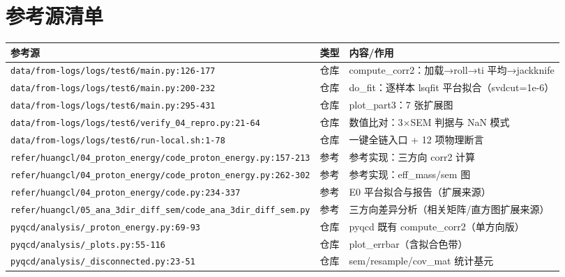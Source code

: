 \documentclass[UTF8]{ctexart}
\begin{document}
\section{参考源清单}
\begin{xltabular}{\textwidth}{llX}
\toprule
\textcolor{evidence}{参考源} & 类型 & 内容/作用 \\
\midrule
\endhead
\texttt{\nolinkurl{data/from-logs/logs/test6/main.py:126-177}} & 仓库 & compute\_corr2：加载→roll→ti 平均→jackknife \\
\texttt{\nolinkurl{data/from-logs/logs/test6/main.py:200-232}} & 仓库 & do\_fit：逐样本 lsqfit 平台拟合（svdcut=1e-6） \\
\texttt{\nolinkurl{data/from-logs/logs/test6/main.py:295-431}} & 仓库 & plot\_part3：7 张扩展图 \\
\texttt{\nolinkurl{data/from-logs/logs/test6/verify_04_repro.py:21-64}} & 仓库 & 数值比对：3$\times$SEM 判据与 NaN 模式 \\
\texttt{\nolinkurl{data/from-logs/logs/test6/run-local.sh:1-78}} & 仓库 & 一键全链入口 + 12 项物理断言 \\
\texttt{\nolinkurl{refer/huangcl/04_proton_energy/code_proton_energy.py:157-213}} & 参考 & 参考实现：三方向 corr2 计算 \\
\texttt{\nolinkurl{refer/huangcl/04_proton_energy/code_proton_energy.py:262-302}} & 参考 & 参考实现：eff\_mass/sem 图 \\
\texttt{\nolinkurl{refer/huangcl/04_proton_energy/code.py:234-337}} & 参考 & E0 平台拟合与报告（扩展来源） \\
\texttt{\nolinkurl{refer/huangcl/05_ana_3dir_diff_sem/code_ana_3dir_diff_sem.py}} & 参考 & 三方向差异分析（相关矩阵/直方图扩展来源） \\
\texttt{\nolinkurl{pyqcd/analysis/_proton_energy.py:69-93}} & 仓库 & pyqcd 既有 compute\_corr2（单方向版） \\
\texttt{\nolinkurl{pyqcd/analysis/_plots.py:55-116}} & 仓库 & plot\_errbar（含拟合色带） \\
\texttt{\nolinkurl{pyqcd/analysis/_disconnected.py:23-51}} & 仓库 & sem/resample/cov\_mat 统计基元 \\
\bottomrule
\end{xltabular}

\end{document}
